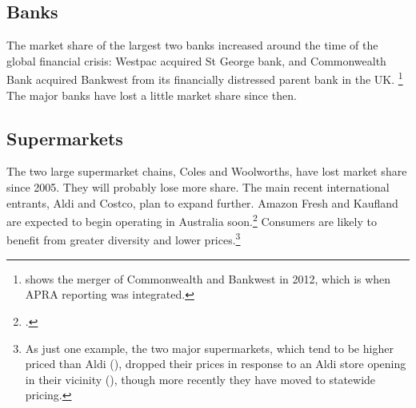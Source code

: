 
\subsection{Banks}
The market share of the largest two banks increased around the time of the global financial crisis: Westpac acquired St George bank, and Commonwealth Bank acquired Bankwest from its financially distressed parent bank in the UK\@.%
\footnote{ shows the merger of Commonwealth and Bankwest in 2012, which is when APRA reporting was integrated.}
The major banks have lost a little market share since then.

\subsection{Supermarkets}

The two large supermarket chains, Coles and Woolworths, have lost market share since 2005. They will probably lose more share. The main recent international entrants, Aldi and Costco, plan to expand further. Amazon Fresh and Kaufland are expected to begin operating in Australia soon.\footcites{Kaufland_2017}{AmazonFresh_2017} %
Consumers are likely to benefit from greater diversity and lower prices.\footnote{As just one example, the two major supermarkets, which tend to be higher priced than Aldi (\textcite{Choice-supermarket-want-to-spend-less}), dropped their prices in response to an Aldi store opening in their vicinity (\textcite{ACCC-grocery-2008}), though more recently they have moved to statewide pricing.}


